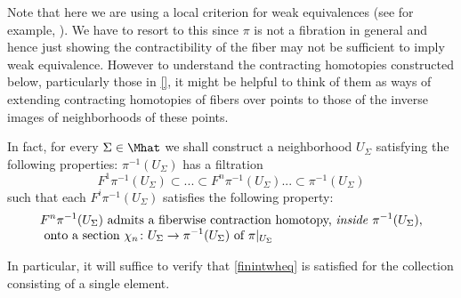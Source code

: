 \documentclass[a4paper,10pt]{amsart}
\begin{document}
\begin{remark} Note that here we are using a local criterion for weak equivalences (see for example, \cite[Corollary 1.4]{may1990weak}). We have to resort to this since $\pi$ is not a fibration in general and hence just showing the contractibility of the fiber may not be sufficient to imply weak equivalence. However to understand the contracting homotopies constructed below, particularly those in \ref{}, it might be helpful to think of them as ways of extending contracting homotopies of fibers over points to those of the inverse images of neighborhoods of these points.
\end{remark}

In fact, for every $\Sigma \in \Mhat$ we shall construct a neighborhood $U_{\Sigma}$ satisfying the following properties: $\pi^{-1}(U_{\Sigma})$ has a filtration
\[ F^1\pi^{-1}(U_{\Sigma}) \subset ... \subset F^n\pi^{-1}(U_{\Sigma}) ... \subset \pi^{-1}(U_{\Sigma})\]
such that each $F^i \pi^{-1}(U_{\Sigma})$ satisfies the following property:
\begin{equation}\label{filtrantncondition}
	\begin{split}
		&F^n \pi^{-1}(U_{\Sigma})  \mbox{ admits a fiberwise contraction homotopy, \emph{inside} } \pi^{-1}(U_{\Sigma}),\\[-4pt]
		&\mbox{ onto a section } \chi_n \colon U_{\Sigma} \to \pi^{-1}(U_{\Sigma}) \mbox{ of } \pi|_{U_{\Sigma}}
	\end{split}
\end{equation}



In particular, it will suffice to verify that \eqref{finintwheq} is satisfied for the collection consisting of a single element.


\end{document}
